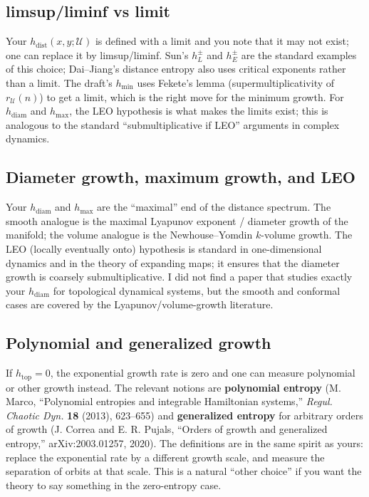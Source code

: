 \documentclass[
]{article}
\begin{document}
\subsection{limsup/liminf vs limit}\label{limsupliminf-vs-limit}

Your \(h_{\mathrm{dist}}(x,y;\mathcal U)\) is defined with a limit and
you note that it may not exist; one can replace it by limsup/liminf.
Sun's \(h_L^\pm\) and \(h_E^\pm\) are the standard examples of this
choice; Dai--Jiang's distance entropy also uses critical exponents
rather than a limit. The draft's \(h_{\min}\) uses Fekete's lemma
(supermultiplicativity of \(r_{\mathcal U}(n)\)) to get a limit, which
is the right move for the minimum growth. For \(h_{\mathrm{diam}}\) and
\(h_{\max}\), the LEO hypothesis is what makes the limits exist; this is
analogous to the standard ``submultiplicative if LEO'' arguments in
complex dynamics.

\subsection{Diameter growth, maximum growth, and
LEO}\label{diameter-growth-maximum-growth-and-leo}

Your \(h_{\mathrm{diam}}\) and \(h_{\max}\) are the ``maximal'' end of
the distance spectrum. The smooth analogue is the maximal Lyapunov
exponent / diameter growth of the manifold; the volume analogue is the
Newhouse--Yomdin \(k\)-volume growth. The LEO (locally eventually onto)
hypothesis is standard in one-dimensional dynamics and in the theory of
expanding maps; it ensures that the diameter growth is coarsely
submultiplicative. I did not find a paper that studies exactly your
\(h_{\mathrm{diam}}\) for topological dynamical systems, but the smooth
and conformal cases are covered by the Lyapunov/volume-growth
literature.

\subsection{Polynomial and generalized
growth}\label{polynomial-and-generalized-growth}

If \(h_{\mathrm{top}}=0\), the exponential growth rate is zero and one
can measure polynomial or other growth instead. The relevant notions are
\textbf{polynomial entropy} (M. Marco, ``Polynomial entropies and
integrable Hamiltonian systems,'' \emph{Regul. Chaotic Dyn.} \textbf{18}
(2013), 623--655) and \textbf{generalized entropy} for arbitrary orders
of growth (J. Correa and E. R. Pujals, ``Orders of growth and
generalized entropy,'' arXiv:2003.01257, 2020). The definitions are in
the same spirit as yours: replace the exponential rate by a different
growth scale, and measure the separation of orbits at that scale. This
is a natural ``other choice'' if you want the theory to say something in
the zero-entropy case.
\end{document}
